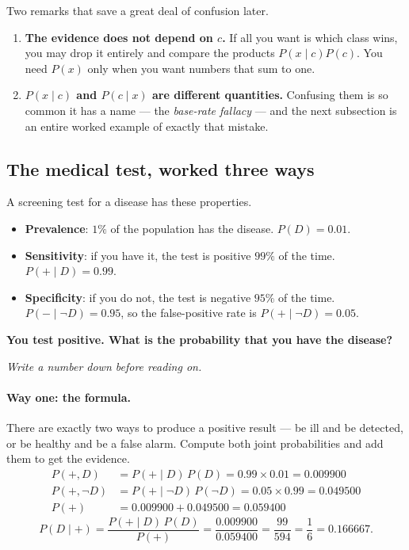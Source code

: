 \documentclass[11pt]{article}
\begin{document}
Two remarks that save a great deal of confusion later.

\begin{enumerate}[leftmargin=*]
  \item \textbf{The evidence does not depend on $c$.} If all you want is
    which class wins, you may drop it entirely and compare the products
    $P(x \mid c)P(c)$. You need $P(x)$ only when you want numbers that sum to
    one.
  \item \textbf{$P(x \mid c)$ and $P(c \mid x)$ are different quantities.}
    Confusing them is so common it has a name --- the \emph{base-rate
    fallacy} --- and the next subsection is an entire worked example of
    exactly that mistake.
\end{enumerate}

\subsection{The medical test, worked three ways}
\label{sec:medical}

\begin{worked}
A screening test for a disease has these properties.
\begin{itemize}
  \item \textbf{Prevalence}: $1\%$ of the population has the disease.
    $P(D) = 0.01$.
  \item \textbf{Sensitivity}: if you have it, the test is positive $99\%$ of
    the time. $P(+ \mid D) = 0.99$.
  \item \textbf{Specificity}: if you do not, the test is negative $95\%$ of
    the time. $P(- \mid \lnot D) = 0.95$, so the false-positive rate is
    $P(+ \mid \lnot D) = 0.05$.
\end{itemize}
\textbf{You test positive. What is the probability that you have the
disease?}

\emph{Write a number down before reading on.}
\end{worked}

\paragraph{Way one: the formula.} There are exactly two ways to produce a
positive result --- be ill and be detected, or be healthy and be a false
alarm. Compute both joint probabilities and add them to get the evidence.
\begin{align*}
  P(+, D)       &= P(+ \mid D)\,P(D)             = 0.99 \times 0.01
                   = 0.009900\\
  P(+, \lnot D) &= P(+ \mid \lnot D)\,P(\lnot D) = 0.05 \times 0.99
                   = 0.049500\\[0.3em]
  P(+)          &= 0.009900 + 0.049500 = 0.059400
\end{align*}
\[
  P(D \mid +) = \frac{P(+ \mid D)\,P(D)}{P(+)}
              = \frac{0.009900}{0.059400}
              = \frac{99}{594} = \frac{1}{6} = 0.166667 .
\]
\end{document}
